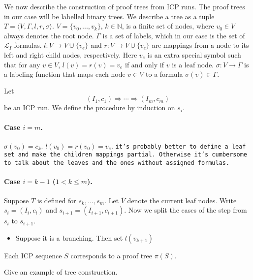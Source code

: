 \documentclass[envcountsect]{llncs}
\begin{document}
We now describe the construction of proof trees from ICP runs. The proof trees in
our case will be labelled binary trees. We describe a tree as a tuple $T = \langle V,
\Gamma, l, r,
\sigma\rangle$. $V = \{v_0, ..., v_k\}$, $k\in \mathbb{N}$, is a finite set of nodes, where $v_0\in V$ always denotes the root
node. $\Gamma$ is a set of labels, which in our case is the set of
$\mathcal{L}_I$-formulas. $l: V \rightarrow V\cup\{v_e\}$ and $r: V\rightarrow V\cup\{v_e\}$ are
mappings from a node to
its left and right child nodes, respectively. Here $v_e$ is an extra special symbol
such that for any $v\in V$, $l(v) = r(v) = v_e$ if and only if $v$ is a leaf
node. $\sigma: V\rightarrow \Gamma$ is a labeling function that maps each node
$v\in V$ to a formula $\sigma(v) \in \Gamma$.

\begin{definition}
Let $$(I_1, c_1)\Longrightarrow \cdots \Longrightarrow (I_m, c_m)$$ be an ICP run.
We define the procedure by induction on $s_i$.
\paragraph{Case $i= m$.} $\sigma(v_0) = c_k$. $l(v_0) = r(v_0) = v_e$. {\tt it's
probably better to define a leaf set and make the children mappings partial.
Otherwise it's cumbersome to talk about the leaves and the ones without
assigned formulas. }
\paragraph{Case $i = k-1$ ($1< k \leq m$). }
Suppose $T$ is defined for $s_k,...,s_m$. Let $\bar V$ denote the current leaf
nodes. Write $s_i = (I_i, c_i)$ and $s_{i+1} = (I_{i+1}, c_{i+1})$. Now we split
the cases of the step from $s_i$ to $s_{i+1}$.
\begin{itemize}
\item Suppose it is a branching. Then set $l(v_{k+1})$
\end{itemize}

\end{definition}

\begin{theorem}[ST-Correspondence]
Each ICP sequence $S$ corresponds to a proof tree $\pi(S)$.
\end{theorem}


\begin{example}
Give an example of tree construction.
\end{example}
\end{document}
